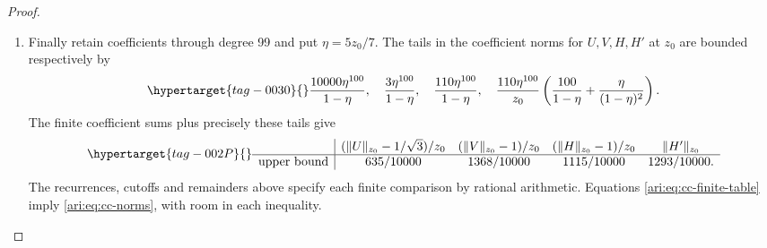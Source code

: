 \begin{proof}
\begin{enumerate}[label=\arabic*.,leftmargin=*]
\item Finally retain coefficients through degree 99 and put
$\eta=5z_0/7$. The tails in the coefficient norms for
$U,V,H,H'$ at $z_0$ are bounded respectively by
\begin{equation}\hypertarget{tag-0030}{}\label{ari:eq:cc-tail100}
 \frac{10000\eta^{100}}{1-\eta},\quad
 \frac{3\eta^{100}}{1-\eta},\quad
 \frac{110\eta^{100}}{1-\eta},\quad
 \frac{110\eta^{100}}{z_0}
 \left(\frac{100}{1-\eta}+\frac{\eta}{(1-\eta)^2}\right).
\end{equation}
The finite coefficient sums plus precisely these tails give
\begin{equation}\hypertarget{tag-002P}{}\label{ari:eq:cc-finite-table}
 \begin{array}{c|cccc}
 & (\|U\|_{z_0}-1/\sqrt3)/z_0
 & (\|V\|_{z_0}-1)/z_0
 & (\|H\|_{z_0}-1)/z_0 & \|H'\|_{z_0}\\ \hline
 \text{upper bound}&635/10000&1368/10000&1115/10000&1293/10000.
 \end{array}
\end{equation}
The recurrences, cutoffs and remainders above specify each
finite comparison by rational arithmetic.
Equations \eqref{ari:eq:cc-finite-table} imply
\eqref{ari:eq:cc-norms}, with room in each inequality.


\end{enumerate}
\end{proof}
